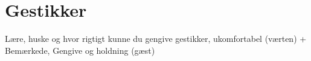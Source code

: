 \section{Gestikker}
\label{TestresultaterSocialAcceptGestikker}
%
Lære, huske og hvor rigtigt kunne du gengive gestikker, ukomfortabel (værten) + Bemærkede, Gengive og holdning (gæst) 